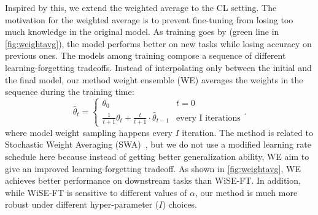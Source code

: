 Inspired by this, we extend the weighted average to the CL setting. The motivation for the weighted average is to prevent fine-tuning from losing too much knowledge in the original model. As training goes by (green line in \cref{fig:weightavg}), the model performs better on new tasks while losing accuracy on previous ones. The models among training compose a sequence of different learning-forgetting tradeoffs. Instead of interpolating only between the initial and the final model, our method weight ensemble (WE) averages the weights in the sequence during the training time:
\begin{equation}
    \hat{\theta}_t = \begin{cases}
        \theta_0 & t=0 \\
        \frac{1}{t+1}{\theta}_{t} + \frac{t}{t+1}\cdot\hat{\theta}_{t-1} & \text{every I iterations}
    \end{cases}.
\end{equation}
where model weight sampling happens every $I$ iteration. 
The method is related to Stochastic Weight Averaging (SWA)~\cite{izmailov2018averaging}, but we do not use a modified learning rate schedule here because instead of getting better generalization ability, WE aim to give an improved learning-forgetting tradeoff. 
As shown in \cref{fig:weightavg}, WE achieves better performance on downstream tasks than WiSE-FT. In addition, while WiSE-FT is sensitive to different values of $\alpha$, our method is much more robust under different hyper-parameter ($I$) choices. 